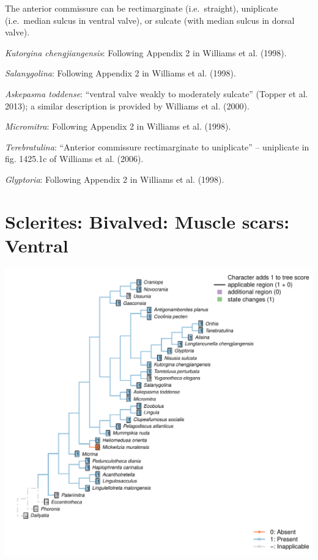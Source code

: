 \documentclass[]{book}
\theoremstyle{definition}
\theoremstyle{definition}
\theoremstyle{definition}
\theoremstyle{remark}
\begin{document}
The anterior commissure can be rectimarginate (i.e.~straight),
uniplicate (i.e.~median sulcus in ventral valve), or sulcate (with
median sulcus in dorsal valve).

\emph{Kutorgina chengjiangensis}: Following Appendix 2 in Williams et
al. (1998).

\emph{Salanygolina}: Following Appendix 2 in Williams et al. (1998).

\emph{Askepasma toddense}: ``ventral valve weakly to moderately
sulcate'' (Topper et al. 2013); a similar description is provided by
Williams et al. (2000).

\emph{Micromitra}: Following Appendix 2 in Williams et al. (1998).

\emph{Terebratulina}: ``Anterior commissure rectimarginate to
uniplicate'' -- uniplicate in fig. 1425.1c of Williams et al. (2006).

\emph{Glyptoria}: Following Appendix 2 in Williams et al. (1998).

\hypertarget{sclerites-bivalved-muscle-scars-ventral}{%
\section*{Sclerites: Bivalved: Muscle scars:
Ventral}\label{sclerites-bivalved-muscle-scars-ventral}}

\includegraphics{Brachiopod_phylogeny_files/figure-latex/unnamed-chunk-5-11.pdf}
\end{document}
